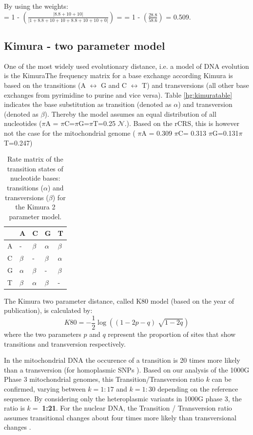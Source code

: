 By using the weights: \\
= 1 - $\left(  \frac{\left| 8.8 + 10 + 10 \right|}{\left| 1 + 8.8 + 10 + 10 + 8.8 + 10 + 10  + 0 \right|}  \right)$  = 
= 1 -  $\left(  \frac{28.8}{58.6} \right)$ = 0.509. 
\subsection{Kimura - two parameter model}
One of the most widely used evolutionary distance, i.e. a model of DNA evolution is the KimuraThe frequency matrix for a base exchange according Kimura\cite{Kimura1980} is based on the transitions (A $\leftrightarrow$ G and C $\leftrightarrow$ T) and transversions (all other base exchanges from pyrimidine to purine and vice versa). Table \ref{hg:kimuratable} indicates the base substitution as transition (denoted as $\alpha$) and transversion (denoted as $\beta$). Thereby the model assumes an equal distribution of all nucleotides ($\pi$A = $\pi$C=$\pi$G=$\pi$T=0.25 $\mathcal{N}.$). Based on the rCRS, this is however not the case for the mitochondrial genome ( $\pi$A = 0.309 $\pi$C= 0.313 $\pi$G=0.131$\pi$T=0.247)
\begin{table}[h]
\label{hg:kimuratable}
\centering
\caption{Rate matrix of the transition states of nucleotide bases: transitions ($\alpha$) and transversions ($\beta$) for the Kimura 2 parameter model.}
\label{mtDNAsource}
\begin{tabular}{lllll}
\hline
   & A&  C   &G  & T\\
\hline

A  & - & $\beta$    & $\alpha$  & $\beta$ \\
C  & $\beta$ &  -   & $\beta$  & $\alpha$ \\
G  & $\alpha$ &  $\beta$    & - & $\beta$ \\
T  & $\beta$ &  $\alpha$    & $\beta$  & - \\
\end{tabular}
\end{table}

The Kimura two parameter distance, called K80 model (based on the year of publication), is calculated by:
\begin{equation}
K80 = - \frac{1}{2} \log((1- 2p -q ) \sqrt[]{1-2q})
\end{equation}
where the two parameters $p$ and $q$ represent the proportion of sites that show transitions and transversion respectively.

In the mitochondrial DNA the occurence of a transition is 20 times more likely than a transversion (for homoplasmic SNPs \cite{Guo2012}). Based on our analysis of the 1000G Phase 3 mitochondrial genomes, this Transition/Transversion ratio $k$ can be confirmed, varying between $k=1:17$ and $k=1:30$ depending on the reference sequence. By considering only the heteroplasmic variants in 1000G phase 3, the ratio is $k=$ \textbf{1:21}. For the nuclear DNA, the Transition / Transversion ratio assumes transitional changes about four times more likely than transversional changes \cite{salemi2009the}. 


